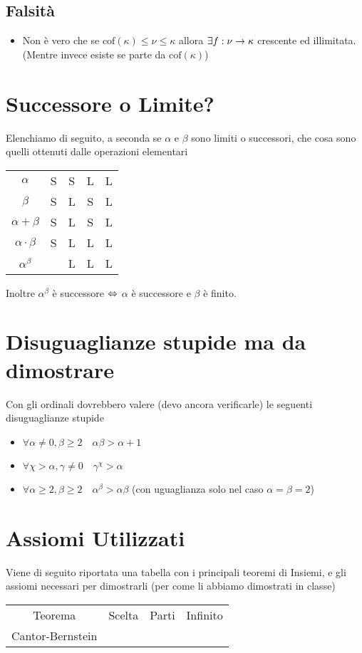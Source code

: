 \documentclass[a4paper,NoNotes,GeneralMath]{stdmdoc}
\newcommand{\cof}[1]{\text{cof}({#1})}
\begin{document}
	\subsection*{Falsità}
	\begin{itemize}
		\item Non è vero che se $\cof{\kappa} \le \nu \le \kappa$ allora $\exists f: \nu \rightarrow \kappa$ crescente ed illimitata. (Mentre invece esiste se parte da $\cof{\kappa}$)
	\end{itemize}
	
	\section*{Successore o Limite?}
	Elenchiamo di seguito, a seconda se $\alpha$ e $\beta$ sono limiti o successori, che cosa sono quelli ottenuti dalle operazioni elementari
	\vskip 0.5cm \begin{tabular}{ccccc}
	$\alpha$             & S & S & L & L \\
	$\beta$              & S & L & S & L \\
	$\alpha + \beta$     & S & L & S & L \\
	$\alpha \cdot \beta$ & S & L & L & L \\
	$\alpha ^ \beta$     &   & L & L & L \\
	\end{tabular} \vskip 0.5cm
	Inoltre $\alpha^\beta$ è successore $\Leftrightarrow$ $\alpha$ è successore e $\beta$ è finito.
	
	\section*{Disuguaglianze stupide ma da dimostrare}
	Con gli ordinali dovrebbero valere (devo ancora verificarle) le seguenti disuguaglianze stupide
	\begin{itemize}
		\item $\forall \alpha \neq 0, \beta \ge 2 \quad \alpha \beta > \alpha + 1$
		\item $\forall \chi > \alpha, \gamma \neq 0 \quad \gamma^\chi > \alpha$
		\item $\forall \alpha \ge 2, \beta \ge 2 \quad \alpha^\beta > \alpha \beta$ (con uguaglianza solo nel caso $\alpha = \beta = 2$)
	\end{itemize}
	
	\section*{Assiomi Utilizzati}
	Viene di seguito riportata una tabella con i principali teoremi di Insiemi, e gli assiomi necessari per dimostrarli (per come li abbiamo dimostrati in classe)
	\vskip 0.5cm
	\begin{tabular}{cccc}
	Teorema                    & Scelta     & Parti      & Infinito   \\
	Cantor-Bernstein           & \crossmark & \crossmark & \checkmark \\
	\end{tabular} \vskip 0.5cm
	
\end{document}
